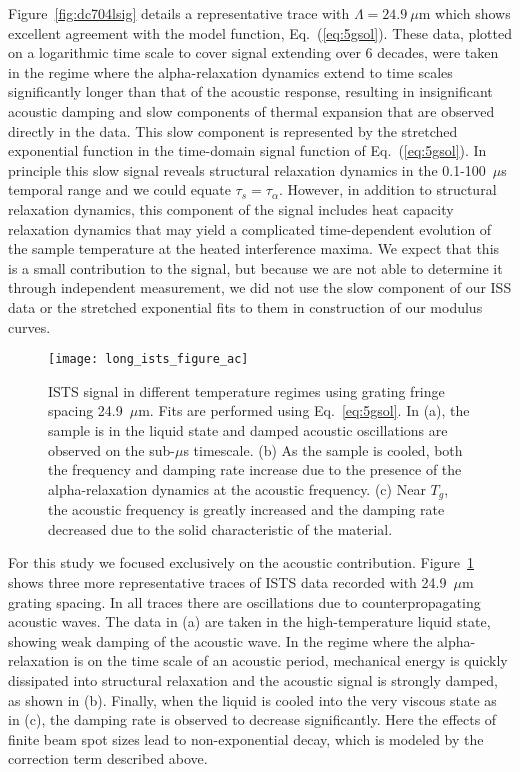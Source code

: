 \documentclass[reprint,showpacs,amsmath,amssymb,aip,jcp]{revtex4-1}
\begin{document}
Figure~\ref{fig:dc704lsig} details a representative trace with
$\Lambda=24.9~\mu$m which shows excellent agreement with the model
function, Eq.~(\ref{eq:5gsol}). These data, plotted on a logarithmic
time scale to cover signal extending over 6 decades, were taken in the
regime where the alpha-relaxation dynamics extend to time scales
significantly longer than that of the acoustic response, resulting in
insignificant acoustic damping and slow components of thermal
expansion that are observed directly in the data. This slow component
is represented by the stretched exponential function in the
time-domain signal function of Eq.~(\ref{eq:5gsol}). In principle this
slow signal reveals structural relaxation dynamics in the
0.1-100~$\mu$s temporal range and we could equate $\tau_s =
\tau_\alpha$. However, in addition to structural relaxation dynamics,
this component of the signal includes heat capacity relaxation
dynamics that may yield a complicated time-dependent evolution of the
sample temperature at the heated interference maxima. We expect that
this is a small contribution to the signal, but because we are not
able to determine it through independent measurement, we did not use
the slow component of our ISS data or the stretched exponential fits
to them in construction of our modulus curves.

\begin{figure}
  \centering
  \texttt{[image: long\_ists\_figure\_ac]}
  \caption{\label{fig:longfig2}ISTS signal in different temperature
    regimes using grating fringe spacing 24.9~$\mu$m. Fits are
    performed using Eq.~\ref{eq:5gsol}. In (a), the sample is in the
    liquid state and damped acoustic oscillations are observed on the
    sub-$\mu$s timescale. (b) As the sample is cooled, both the
    frequency and damping rate increase due to the presence of the
    alpha-relaxation dynamics at the acoustic frequency. (c) Near
    $T_g$, the acoustic frequency is greatly increased and the damping
    rate decreased due to the solid characteristic of the material.}
\end{figure}

For this study we focused exclusively on the acoustic
contribution. Figure~\ref{fig:longfig2} shows three more
representative traces of ISTS data recorded with 24.9~$\mu$m grating
spacing. In all traces there are oscillations due to
counterpropagating acoustic waves. The data in (a) are taken in the
high-temperature liquid state, showing weak damping of the acoustic
wave. In the regime where the alpha-relaxation is on the time scale
of an acoustic period, mechanical energy is quickly dissipated into
structural relaxation and the acoustic signal is strongly damped, as
shown in (b). Finally, when the liquid is cooled into the very viscous
state as in (c), the damping rate is observed to decrease
significantly. Here the effects of finite beam spot sizes lead to
non-exponential decay, which is modeled by the correction term
described above.
\end{document}
